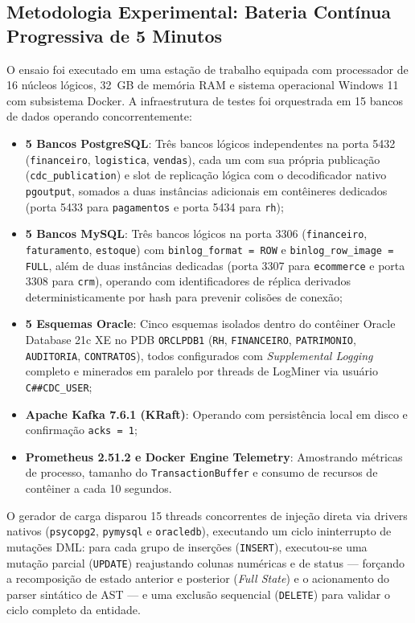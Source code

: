 \documentclass[12pt]{article}
\begin{document}
\subsection{Metodologia Experimental: Bateria Contínua Progressiva de 5 Minutos}
\label{sec:eval_method}

O ensaio foi executado em uma estação de trabalho equipada com processador de 16 núcleos lógicos, 32~GB de memória RAM e sistema operacional Windows 11 com subsistema Docker. A infraestrutura de testes foi orquestrada em 15 bancos de dados operando concorrentemente:
\begin{itemize}
  \item \textbf{5 Bancos PostgreSQL}: Três bancos lógicos independentes na porta 5432 (\texttt{financeiro}, \texttt{logistica}, \texttt{vendas}), cada um com sua própria publicação (\texttt{cdc\_publication}) e slot de replicação lógica com o decodificador nativo \texttt{pgoutput}, somados a duas instâncias adicionais em contêineres dedicados (porta 5433 para \texttt{pagamentos} e porta 5434 para \texttt{rh});
  \item \textbf{5 Bancos MySQL}: Três bancos lógicos na porta 3306 (\texttt{financeiro}, \texttt{faturamento}, \texttt{estoque}) com \texttt{binlog\_format = ROW} e \texttt{binlog\_row\_image = FULL}, além de duas instâncias dedicadas (porta 3307 para \texttt{ecommerce} e porta 3308 para \texttt{crm}), operando com identificadores de réplica derivados deterministicamente por hash para prevenir colisões de conexão;
  \item \textbf{5 Esquemas Oracle}: Cinco esquemas isolados dentro do contêiner Oracle Database 21c XE no PDB \texttt{ORCLPDB1} (\texttt{RH}, \texttt{FINANCEIRO}, \texttt{PATRIMONIO}, \texttt{AUDITORIA}, \texttt{CONTRATOS}), todos configurados com \textit{Supplemental Logging} completo e minerados em paralelo por threads de LogMiner via usuário \texttt{C\#\#CDC\_USER};
  \item \textbf{Apache Kafka 7.6.1 (KRaft)}: Operando com persistência local em disco e confirmação \texttt{acks = 1};
  \item \textbf{Prometheus 2.51.2 e Docker Engine Telemetry}: Amostrando métricas de processo, tamanho do \texttt{TransactionBuffer} e consumo de recursos de contêiner a cada 10 segundos.
\end{itemize}

O gerador de carga disparou 15 threads concorrentes de injeção direta via drivers nativos (\texttt{psycopg2}, \texttt{pymysql} e \texttt{oracledb}), executando um ciclo ininterrupto de mutações DML: para cada grupo de inserções (\texttt{INSERT}), executou-se uma mutação parcial (\texttt{UPDATE}) reajustando colunas numéricas e de status — forçando a recomposição de estado anterior e posterior (\textit{Full State}) e o acionamento do parser sintático de AST — e uma exclusão sequencial (\texttt{DELETE}) para validar o ciclo completo da entidade.
\end{document}
